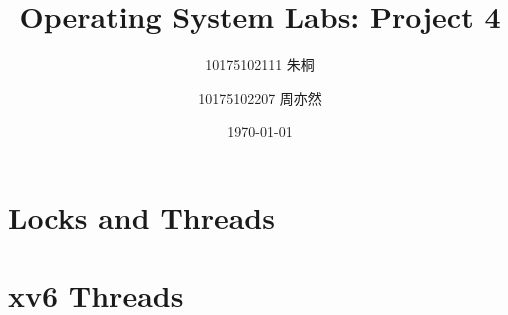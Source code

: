 \documentclass[a4paper,11pt,UTF8]{article}
\title{Operating System Labs: Project 4}
\author{10175102111 \quad 朱桐 \and 10175102207 \quad 周亦然}
\date{\today}
\numberwithin{equation}{section}
\numberwithin{figure}{section}
\begin{document}
\maketitle

\renewcommand\thesection{\alph{section}}

\tableofcontents

\clearpage

\section{Locks and Threads}



\clearpage

\section{xv6 Threads}


\end{document}
